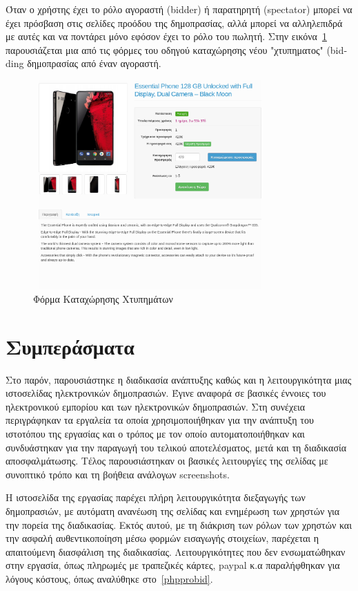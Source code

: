 \documentclass[12pt]{report}
\begin{document}
Όταν ο χρήστης έχει το ρόλο αγοραστή (\textlatin{bidder}) ή παρατηρητή (\textlatin{spectator}) μπορεί να έχει πρόσβαση στις σελίδες προόδου της δημοπρασίας, αλλά μπορεί να αλληλεπιδρά με αυτές και να ποντάρει μόνο εφόσον έχει το ρόλο του πωλητή. Στην εικόνα~\ref{fig:auction_bid} παρουσιάζεται μια από τις φόρμες του οδηγού καταχώρησης νέου "χτυπηματος" (\textlatin{bidding} δημοπρασίας από έναν αγοραστή.
\begin{figure}[H]
\centering
\includegraphics[width=0.8\textwidth, height=8cm]{Screenshot-2018-1-14-Essential-Phone-128-GB-Unlocked-with-Full-Display-Dual-Camera-Black-Moon-1}
\caption{Φόρμα Καταχώρησης Χτυπημάτων}
\label{fig:auction_bid}
\end{figure}

\section{Συμπεράσματα}
Στο παρόν, παρουσιάστηκε η διαδικασία ανάπτυξης καθώς και η λειτουργικότητα μιας ιστοσελίδας ηλεκτρονικών δημοπρασιών. Έγινε αναφορά σε βασικές έννοιες του ηλεκτρονικού εμπορίου και των ηλεκτρονικών δημοπρασιών. Στη συνέχεια περιγράφηκαν τα εργαλεία τα οποία χρησιμοποιήθηκαν για την ανάπτυξη του ιστοτόπου της εργασίας και ο τρόπος με τον οποίο αυτοματοποιήθηκαν και συνδυάστηκαν για την παραγωγή του τελικού αποτελέσματος, μετά και τη διαδικασία αποσφαλμάτωσης. Τέλος παρουσιάστηκαν οι βασικές λειτουργίες της σελίδας με συνοπτικό τρόπο και τη βοήθεια ανάλογων \textlatin{screenshots}.

Η ιστοσελίδα της εργασίας παρέχει πλήρη λειτουργικότητα διεξαγωγής των δημοπρασιών, με αυτόματη ανανέωση της σελίδας και ενημέρωση των χρηστών για την πορεία της διαδικασίας. Εκτός αυτού, με τη διάκριση των ρόλων των χρηστών και την ασφαλή αυθεντικοποίηση μέσω φορμών εισαγωγής στοιχείων, παρέχεται η απαιτούμενη διασφάλιση της διαδικασίας. Λειτουργικότητες που δεν ενσωματώθηκαν στην εργασία, όπως πληρωμές με τραπεζικές κάρτες, \textlatin{paypal} κ.α παραλήφθηκαν για λόγους κόστους, όπως αναλύθηκε στο~\ref{phpprobid}.
\end{document}
